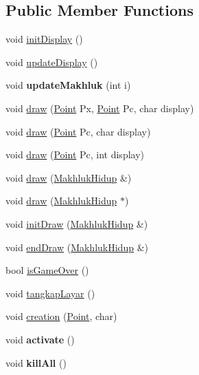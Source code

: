 \subsection*{Public Member Functions}
\begin{DoxyCompactItemize}
\item 
void \hyperlink{class_world_a3ccab52e143cc85200d3d4a5384c4559}{init\+Display} ()
\item 
void \hyperlink{class_world_a0656cc8aa64881db8880d6a1af0d5aea}{update\+Display} ()
\item 
void {\bfseries update\+Makhluk} (int i)\hypertarget{class_world_a724bfca6248fdb1088143be2cab280e2}{}\label{class_world_a724bfca6248fdb1088143be2cab280e2}

\item 
void \hyperlink{class_world_a4b86052df7db7bb46cca3e195c8bf898}{draw} (\hyperlink{class_point}{Point} Px, \hyperlink{class_point}{Point} Pc, char display)
\item 
void \hyperlink{class_world_ae08f8491c85c42b9951fa51b1b859fa7}{draw} (\hyperlink{class_point}{Point} Pc, char display)
\item 
void \hyperlink{class_world_a34b02a09a430919369fa3cf6c664f384}{draw} (\hyperlink{class_point}{Point} Pc, int display)
\item 
void \hyperlink{class_world_abb9e5b837315e20d4cdca5b154b9730d}{draw} (\hyperlink{class_makhluk_hidup}{Makhluk\+Hidup} \&)
\item 
void \hyperlink{class_world_ad1e2e50d7734e8e86c45a2e94d8a3a7c}{draw} (\hyperlink{class_makhluk_hidup}{Makhluk\+Hidup} $\ast$)
\item 
void \hyperlink{class_world_a90d88a70e0db9152a75fda712cf7dd43}{init\+Draw} (\hyperlink{class_makhluk_hidup}{Makhluk\+Hidup} \&)
\item 
void \hyperlink{class_world_ab11226032a384c6afedc09b28664a7fc}{end\+Draw} (\hyperlink{class_makhluk_hidup}{Makhluk\+Hidup} \&)
\item 
bool \hyperlink{class_world_a461cec44996dcc3cfd000d7985647c8b}{is\+Game\+Over} ()
\item 
void \hyperlink{class_world_a1a58ba32325aef74e5d5e769a5f04509}{tangkap\+Layar} ()
\item 
void \hyperlink{class_world_ad7791111d93057dcb5bf09628e57acf4}{creation} (\hyperlink{class_point}{Point}, char)
\item 
void {\bfseries activate} ()\hypertarget{class_world_a6ab4734e4ffb228eeef4a6c8f4a8638e}{}\label{class_world_a6ab4734e4ffb228eeef4a6c8f4a8638e}

\item 
void {\bfseries kill\+All} ()\hypertarget{class_world_ab61b44377b5e8fe932a81637ac18745d}{}\label{class_world_ab61b44377b5e8fe932a81637ac18745d}

\end{DoxyCompactItemize}
